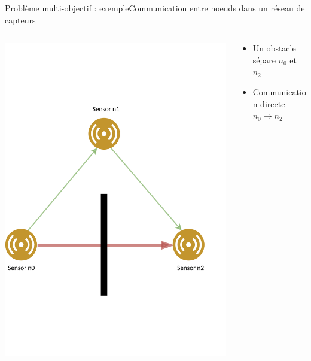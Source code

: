 \documentclass[compress]{beamer}
\theoremstyle{theorem}%
\begin{document}
\begin{frame}{Problème multi-objectif : exemple}{Communication entre noeuds dans un réseau de capteurs}\footnotesize
\begin{columns}
\begin{column}{0.4\linewidth}
  \begin{center}
    \includegraphics[width=\linewidth]{resources/example2.pdf}
  \end{center}
\end{column}
\begin{column}{0.6\linewidth}
    \vspace{-.03\linewidth}
    \begin{itemize}
      \item Un obstacle sépare $n_0$ et $n_2$
      \item Communication directe $n_0 \rightarrow n_2$
      \vspace{-.03\linewidth}

\end{itemize}
\end{column}
\end{columns}
\end{frame}
\end{document}
